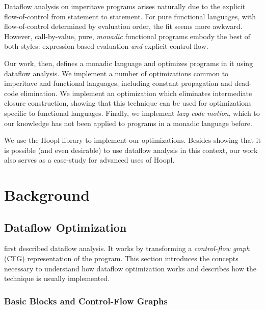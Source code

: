 \documentclass[12pt]{report}
\begin{document}
Dataflow analysis on imperitave programs arises naturally due to the
explicit flow-of-control from statement to statement. For pure
functional languages, with flow-of-control determined by evaluation
order, the fit seems more awkward. However, call-by-value, pure,
\emph{monadic} functional programs embody the best of both
styles: expression-based evaluation \emph{and} explicit
control-flow. 

Our work, then, defines a monadic language and optimizes programs in
it using dataflow analysis. We implement a number of optimizations
common to imperitave and functional languages, including constant
propagation and dead-code elimination. We implement an optimization
which eliminates intermediate closure construction, showing that this
technique can be used for optimizations specific to functional
languages. Finally, we implement \emph{lazy code motion}, which to our
knowledge has not been applied to programs in a monadic language
before.

We use the Hoopl library to implement our
optimizations. Besides showing that it is possible (and even
desirable) to use dataflow analysis in this context, our work also
serves as a case-study for advanced uses of Hoopl.

\chapter{Background}



\section{Dataflow Optimization}

\citet{SoAndSo} first described dataflow
analysis. It works by transforming a \emph{control-flow graph} (CFG)
representation of the program. This section introduces the concepts
necessary to understand how dataflow optimization works and describes
how the technique is usually implemented.

\subsection{Basic Blocks and Control-Flow Graphs}
\end{document}
